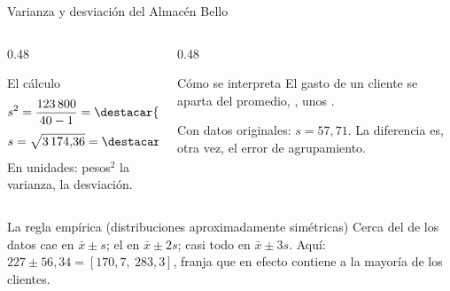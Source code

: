 \documentclass[aspectratio=169,10pt]{beamer}
\begin{document}
\begin{frame}{Varianza y desviación del Almacén Bello}
  \footnotesize
  \begin{columns}[T,onlytextwidth]
    \begin{column}{0.48\textwidth}
      \begin{exampleblock}{El cálculo}
        \scriptsize
        \[ s^2 = \frac{123\,800}{40-1} = \destacar{3\,174{,}36} \]
        \[ s = \sqrt{3\,174{,}36} = \destacar{56{,}34} \]
        En unidades: pesos$^2$ la varianza,  la
        desviación.
      \end{exampleblock}
    \end{column}
    \begin{column}{0.48\textwidth}
      \begin{block}{Cómo se interpreta}
        \scriptsize
        El gasto de un cliente se aparta del promedio, , unos
        .

        \vspace{0.1cm}
        Con datos originales: $s = 57{,}71$. La diferencia es, otra vez, el
        error de agrupamiento.
      \end{block}
    \end{column}
  \end{columns}

  \vspace{0.1cm}
  \begin{alertblock}{La regla empírica (distribuciones aproximadamente simétricas)}
    \scriptsize
    Cerca del  de los datos cae en $\bar{x} \pm s$;
    el  en $\bar{x} \pm 2s$; casi todo en $\bar{x} \pm 3s$.
    Aquí: $227 \pm 56{,}34 = [170{,}7,\ 283{,}3]$, franja que en efecto
    contiene a la mayoría de los clientes.
  \end{alertblock}
\end{frame}
\end{document}
